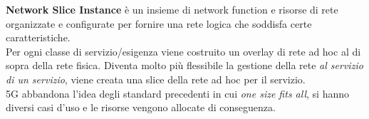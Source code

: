 \textbf{Network Slice Instance} è un insieme di network function e risorse di rete organizzate e configurate per fornire una rete logica che soddisfa certe caratteristiche.\\

Per ogni classe di servizio/esigenza viene costruito un overlay di rete ad hoc al di sopra della rete fisica. Diventa molto più flessibile la gestione della rete \textit{al servizio di un servizio}, viene creata una slice della rete ad hoc per il servizio.\\

5G abbandona l'idea degli standard precedenti in cui \textit{one size fits all}, si hanno diversi casi d'uso e le risorse vengono allocate di conseguenza. \\


\newpage